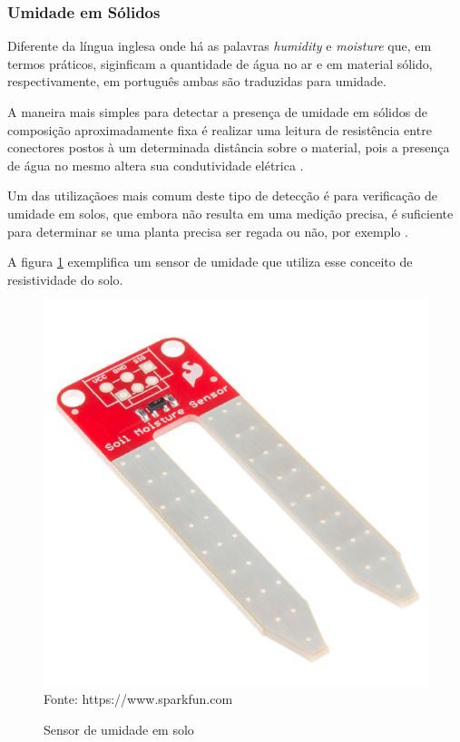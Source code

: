 \subsubsection{Umidade em Sólidos}
Diferente da língua inglesa onde há as palavras \textit{humidity} e \textit{moisture} que, em termos práticos,
siginficam a quantidade de água no ar e em material sólido, respectivamente, em português ambas são traduzidas
para umidade.

A maneira mais simples para detectar a presença de umidade em sólidos de composição aproximadamente fixa é
realizar uma leitura de resistência entre conectores postos à um determinada distância sobre o material, pois
a presença de água no mesmo altera sua condutividade elétrica \cite{sinclair2001,fraden2010}.

Um das utilizaçãoes mais comum deste tipo de detecção é para verificação de umidade em solos, que embora não
resulta em uma medição precisa, é suficiente para determinar se uma planta precisa ser regada ou não, por
exemplo \cite{sinclair2001}.

A figura \ref{figura:soil_moisture} exemplifica um sensor de umidade que utiliza esse conceito de
resistividade do solo.

\begin{figure}[h]
	\caption{Sensor de umidade em solo}
	\centering
	\includegraphics[scale=0.25]{../images/soil_moisture.jpg}
	\hspace{\linewidth}
	Fonte: https://www.sparkfun.com
	\label{figura:soil_moisture}
\end{figure}

